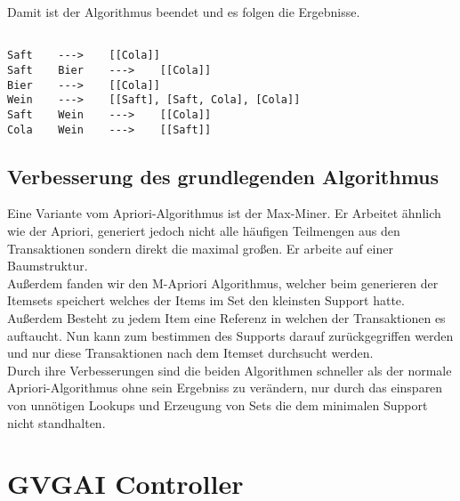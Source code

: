 \documentclass[a4paper]{article}
\begin{document}
Damit ist der Algorithmus beendet und es folgen die Ergebnisse. 
\begin{lstlisting}

Saft	--->	[[Cola]]
Saft	Bier	--->	[[Cola]]
Bier	--->	[[Cola]]
Wein	--->	[[Saft], [Saft, Cola], [Cola]]
Saft	Wein	--->	[[Cola]]
Cola	Wein	--->	[[Saft]]

\end{lstlisting}
\subsection{Verbesserung des grundlegenden Algorithmus}
Eine Variante vom Apriori-Algorithmus ist der Max-Miner. Er Arbeitet ähnlich wie der Apriori, generiert jedoch nicht alle häufigen Teilmengen aus den Transaktionen sondern direkt die maximal großen. Er arbeite auf einer Baumstruktur. \\
Außerdem fanden wir den M-Apriori Algorithmus, welcher beim generieren der Itemsets speichert welches der Items im Set den kleinsten Support hatte. Außerdem Besteht zu jedem Item eine Referenz in welchen der Transaktionen es auftaucht. Nun kann zum bestimmen des Supports darauf zurückgegriffen werden und nur diese Transaktionen nach dem Itemset durchsucht werden.\\
Durch ihre Verbesserungen sind die beiden Algorithmen schneller als der normale Apriori-Algorithmus ohne sein Ergebniss zu verändern, nur durch das einsparen von unnötigen Lookups und Erzeugung von Sets die dem minimalen Support nicht standhalten.

\section{GVGAI Controller}
\end{document}
